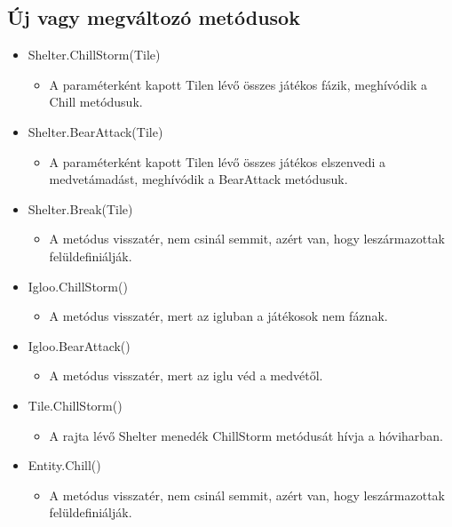 \subsection{Új vagy megváltozó metódusok}
\begin{itemize}
\item Shelter.ChillStorm(Tile)
\begin{itemize} \item A paraméterként kapott Tilen lévő összes játékos fázik, meghívódik a Chill metódusuk. \end{itemize}

\item Shelter.BearAttack(Tile)
\begin{itemize} \item A paraméterként kapott Tilen lévő összes játékos elszenvedi a medvetámadást, meghívódik a BearAttack metódusuk.  \end{itemize}

\item Shelter.Break(Tile)
\begin{itemize} \item A metódus visszatér, nem csinál semmit, azért van, hogy leszármazottak felüldefiniálják. \end{itemize}

\item Igloo.ChillStorm()
\begin{itemize} \item A metódus visszatér, mert az igluban a játékosok nem fáznak. \end{itemize}

\item Igloo.BearAttack()
\begin{itemize} \item A metódus visszatér, mert az iglu véd a medvétől. \end{itemize}

\item Tile.ChillStorm()
\begin{itemize} \item A rajta lévő Shelter menedék ChillStorm metódusát hívja a hóviharban. \end{itemize}

\item Entity.Chill() 
\begin{itemize} \item A metódus visszatér, nem csinál semmit, azért van, hogy leszármazottak felüldefiniálják. \end{itemize}


\end{itemize}
